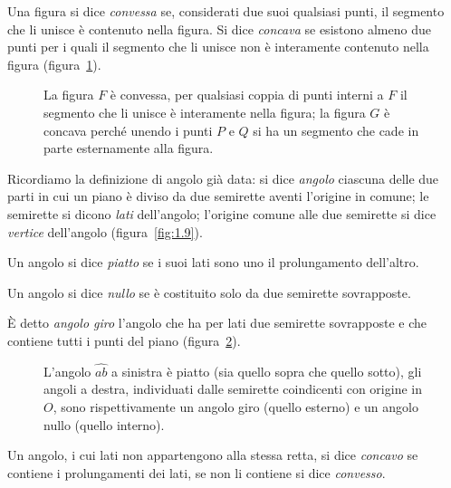 \begin{definizione}
Una figura si dice \emph{convessa} se, considerati due suoi qualsiasi punti, il segmento che li unisce è contenuto nella figura. Si dice \emph{concava} se esistono almeno due punti per i quali il segmento che li unisce non è interamente contenuto nella figura (figura~\ref{fig:1.18}).
\end{definizione}
\begin{figure}[b,t,h]
 \centering 
 \caption{La figura $ F $ è convessa, per qualsiasi coppia di punti interni a $ F $ il segmento che li unisce è interamente nella figura; la figura $ G $ è concava perché unendo i punti $ P $ e $ Q $ si ha un segmento che cade in parte esternamente alla figura.}\label{fig:1.18}
\end{figure}

Ricordiamo la definizione di angolo già data: si dice \emph{angolo} ciascuna delle due parti in cui un piano è diviso da due semirette aventi l'origine in comune; le semirette si dicono \emph{lati} dell'angolo; l'origine comune alle due semirette si dice \emph{vertice} dell'angolo (figura~\ref{fig:1.9}).

\begin{definizione}
Un angolo si dice \emph{piatto} se i suoi lati sono uno il prolungamento dell'altro.
\end{definizione}

\begin{definizione}
Un angolo si dice \emph{nullo} se è costituito solo da due semirette sovrapposte.
\end{definizione}

\begin{definizione}
\`E detto \emph{angolo giro} l'angolo che ha per lati due semirette sovrapposte e che contiene tutti i punti del piano (figura~\ref{fig:1.19}).
\end{definizione}
\begin{figure}[bth]
 \centering 
 \caption{L'angolo  $\widehat{ab}$ a sinistra è piatto (sia quello sopra che quello sotto), gli angoli a destra, individuati dalle semirette coindicenti con origine in $O$, sono rispettivamente un angolo giro (quello esterno) e un angolo nullo (quello interno).}\label{fig:1.19}
\end{figure}

\begin{definizione}
Un angolo, i cui lati non appartengono alla stessa retta, si dice \emph{concavo} se contiene i prolungamenti dei lati, se non li contiene si dice \emph{convesso}.
\end{definizione}

